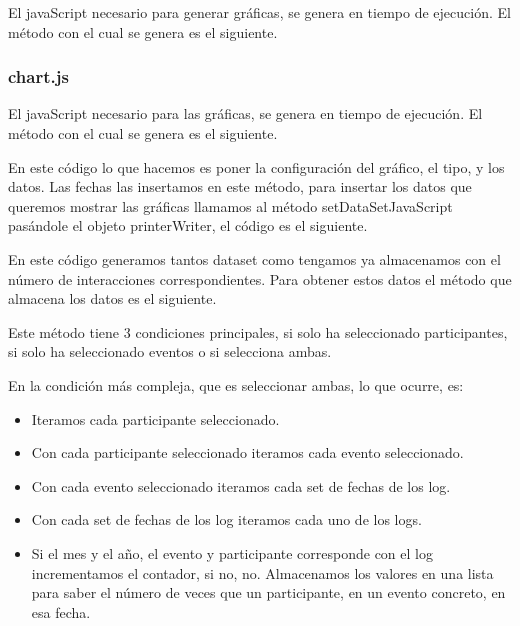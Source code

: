 El javaScript necesario para generar gráficas, se genera en tiempo de ejecución. El método con el cual se genera es el siguiente.


\subsubsection{chart.js}\label{chart-js}

El javaScript necesario para las gráficas, se genera en tiempo de ejecución. El método con el cual se genera es el siguiente.


En este código lo que hacemos es poner la configuración del gráfico, el tipo, y los datos. Las fechas las insertamos en este método, para insertar los datos que queremos mostrar las gráficas llamamos al método setDataSetJavaScript pasándole el objeto printerWriter, el código es el siguiente.


En este código generamos tantos dataset como tengamos ya almacenamos con el número de interacciones correspondientes. Para obtener estos datos el método que almacena los datos es el siguiente.


Este método tiene 3 condiciones principales, si solo ha seleccionado participantes, si solo ha seleccionado eventos o si selecciona ambas.

En la condición más compleja, que es seleccionar ambas, lo que ocurre, es:

\begin{itemize}
	\tightlist
	\item
	Iteramos cada participante seleccionado.
	\item
	Con cada participante seleccionado iteramos cada evento seleccionado.
	\item
	Con cada evento seleccionado iteramos cada set de fechas de los log.
	\item
	Con cada set de fechas de los log iteramos cada uno de los logs.
	\item
	Si el mes y el año, el evento y participante corresponde con el log incrementamos el contador, si no, no. Almacenamos los valores en una lista para saber el número de veces que un participante, en un evento concreto, en esa fecha.
\end{itemize}


